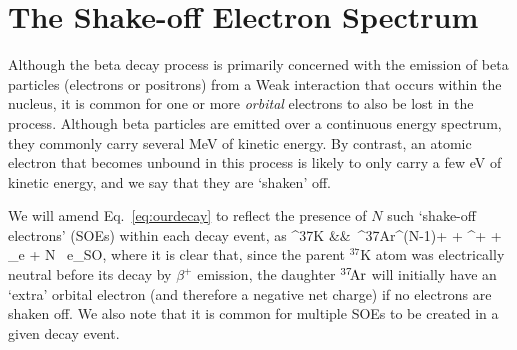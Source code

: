 






\section{The Shake-off Electron Spectrum}
\label{section:soe_intro}
Although the beta decay process is primarily concerned with the emission of beta particles (electrons or positrons) from a Weak interaction that occurs within the nucleus, it is common for one or more \emph{orbital} electrons to also be lost in the process.  Although beta particles are emitted over a continuous energy spectrum, they commonly carry several MeV of kinetic energy.  By contrast, an atomic electron that becomes unbound in this process is likely to only carry a few eV of kinetic energy, and we say that they are `shaken' off.  

We will amend Eq.~\ref{eq:ourdecay} to reflect the presence of $N$ such `shake-off electrons' (SOEs) within each decay event, as
\bea
^{37}\textrm{K} &\rightarrow& \,^{37}\textrm{\!Ar}^{(N-1)+} + \beta^{+} + \nu_e + N \, e_{\textrm{SO}}, 
\label{eq:ourdecay_withsoe}
\eea
{}
where it is clear that, since the parent $^{37}\textrm{K}$ atom was electrically neutral before its decay by $\beta^+$ emission, the daughter $^{37}\textrm{\!Ar}$ will initially have an `extra' orbital electron (and therefore a negative net charge) if no electrons are shaken off.  We also note that it is common for multiple SOEs to be created in a given decay event.  

